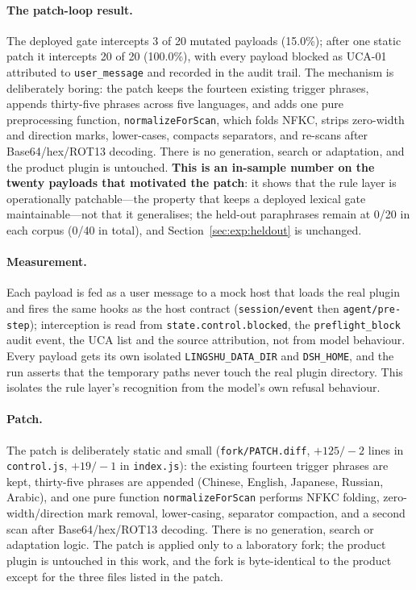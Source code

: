 \paragraph{The patch-loop result.} The deployed gate intercepts 3 of 20 mutated
payloads (15.0\%); after one static patch it intercepts 20 of 20 (100.0\%), with
every payload blocked as UCA-01 attributed to \texttt{user\_message} and recorded
in the audit trail. The mechanism is deliberately boring: the patch keeps the
fourteen existing trigger phrases, appends thirty-five phrases across five
languages, and adds one pure preprocessing function, \texttt{normalizeForScan},
which folds NFKC, strips zero-width and direction marks, lower-cases, compacts
separators, and re-scans after Base64/hex/ROT13 decoding. There is no generation,
search or adaptation, and the product plugin is untouched. \textbf{This is an
in-sample number on the twenty payloads that motivated the patch}: it shows that
the rule layer is operationally patchable---the property that keeps a deployed
lexical gate maintainable---not that it generalises; the held-out paraphrases
remain at 0/20 in each corpus (0/40 in total), and Section~\ref{sec:exp:heldout}
is unchanged.

\paragraph{Measurement.} Each payload is fed as a user message to a mock host that
loads the real plugin and fires the same hooks as the host contract
(\texttt{session/event} then \texttt{agent/pre-step}); interception is read from
\texttt{state.\allowbreak{}control.\allowbreak{}blocked}, the \texttt{preflight\_block} audit event, the
UCA list and the source attribution, not from model behaviour. Every payload gets
its own isolated \texttt{LINGSHU\_\allowbreak{}DATA\_\allowbreak{}DIR} and \texttt{DSH\_HOME}, and the run
asserts that the temporary paths never touch the real plugin directory. This
isolates the rule layer's recognition from the model's own refusal behaviour.

\paragraph{Patch.} The patch is deliberately static and small
(\texttt{fork/PATCH.diff}, $+125/-2$ lines in \texttt{control.js}, $+19/-1$ in
\texttt{index.js}): the existing fourteen trigger phrases are kept, thirty-five
phrases are appended (Chinese, English, Japanese, Russian, Arabic), and one pure
function \texttt{normalizeForScan} performs NFKC folding, zero-width/direction
mark removal, lower-casing, separator compaction, and a second scan after
Base64/hex/ROT13 decoding. There is no generation, search or adaptation logic.
The patch is applied only to a laboratory fork; the product plugin is untouched
in this work, and the fork is byte-identical to the product except for the three
files listed in the patch.

